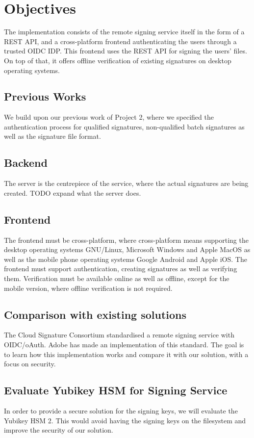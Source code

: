 \chapter*{Objectives}
\label{ch:objectives}

The implementation consists of the remote signing service itself in the form of a \gls{REST} \gls{API},
and a cross-platform frontend authenticating the users through a trusted \gls{OIDC} \gls{IDP}.
This frontend uses the \gls{REST} \gls{API} for signing the users' files.
On top of that, it offers offline verification of existing signatures on desktop operating systems.

\section{Previous Works}
\label{section:previousworks}

We build upon our previous work of Project 2\cite{projekt2}, where we specified the authentication process
for qualified signatures, non-qualified batch signatures as well as the signature file format.

\section{Backend}
\label{section:backend}

The server is the centrepiece of the service, where the actual signatures are being created. TODO expand what the server does.

\section{Frontend}
\label{section:frontend}

The frontend must be cross-platform, where cross-platform means supporting the desktop operating systems
GNU/Linux, Microsoft Windows and Apple MacOS as well as the mobile phone operating systems Google Android and Apple iOS.
The frontend must support authentication, creating signatures as well as verifying them.
Verification must be available online as well as offline, except for the mobile version, where offline verification is not required.

\section{Comparison with existing solutions}
\label{section:comparison}

The Cloud Signature Consortium standardised a remote signing service with OIDC/oAuth. Adobe has made an implementation of this standard.
The goal is to learn how this implementation works and compare it with our solution, with a focus on security.

\section{Evaluate Yubikey HSM for Signing Service}
\label{section:evaluateyubikey}

In order to provide a secure solution for the signing keys, we will evaluate the Yubikey HSM 2.
This would avoid having the signing keys on the filesystem and improve the security of our solution.